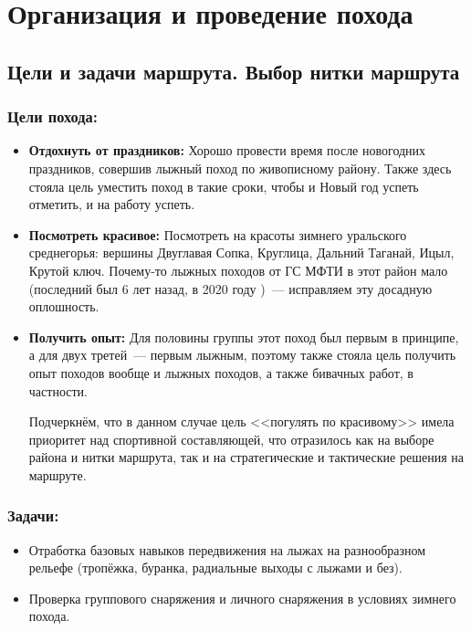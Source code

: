 	\section{Организация и проведение похода}
\subsection{Цели и задачи маршрута. Выбор нитки маршрута}
\subsubsection{Цели похода:}
\begin{itemize}
	\item \textbf{Отдохнуть от праздников:} Хорошо провести время после новогодних праздников, совершив лыжный поход по живописному району. Также здесь стояла цель уместить поход в такие сроки, чтобы и Новый год успеть отметить, и на работу успеть.
	\item \textbf{Посмотреть красивое:} Посмотреть на красоты зимнего уральского среднегорья: вершины Двуглавая Сопка, Круглица, Дальний Таганай, Ицыл, Крутой ключ. Почему-то лыжных походов от ГС МФТИ в этот район мало (последний был 6 лет назад, в 2020 году \cite{brunarsky2020})~--- исправляем эту досадную оплошность.
	
	\item \textbf{Получить опыт:} Для половины группы этот поход был первым в принципе, а для двух третей~--- первым лыжным, поэтому также стояла цель получить опыт походов вообще и лыжных походов, а также бивачных работ, в частности.
	
	Подчеркнём, что в данном случае цель <<погулять по красивому>> имела приоритет над спортивной составляющей, что отразилось как на выборе района и нитки маршрута, так и на стратегические и тактические решения на маршруте.
\end{itemize}

\subsubsection{Задачи:}
\begin{itemize}
	\item Отработка базовых навыков передвижения на лыжах на разнообразном рельефе (тропёжка, буранка, радиальные выходы с лыжами и без).
	\item Проверка группового снаряжения и личного снаряжения в условиях зимнего похода.
\end{itemize}

